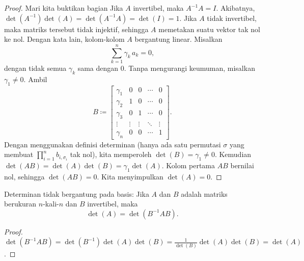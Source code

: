 \begin{proof}
Mari kita buktikan bagian
Jika $A$ invertibel,
maka $A^{-1}A = I$.
Akibatnya, $\det(A^{-1})\det(A) = \det(A^{-1}A) = \det(I) = 1$.
Jika $A$ tidak invertibel, maka matriks tersebut tidak injektif, sehingga $A$ memetakan
suatu vektor tak nol ke nol.
Dengan kata lain, kolom-kolom $A$ bergantung linear.
Misalkan
\begin{equation*}
\sum_{k=1}^n \gamma_k\, a_k = 0 ,
\end{equation*}
dengan tidak semua $\gamma_k$ sama dengan 0.
Tanpa mengurangi keumuman, misalkan $\gamma_1\neq 0$.
Ambil
\begin{equation*}
B \coloneqq
\begin{bmatrix}
\gamma_1 & 0 & 0 & \cdots & 0 \\
\gamma_2 & 1 & 0 & \cdots & 0 \\
\gamma_3 & 0 & 1 & \cdots & 0 \\
\vdots & \vdots & \vdots & \ddots & \vdots \\
\gamma_n & 0 & 0 & \cdots & 1
\end{bmatrix} .
\end{equation*}
Dengan menggunakan definisi determinan (hanya ada satu
permutasi $\sigma$ yang membuat $\prod_{i=1}^n b_{i,\sigma_i}$ tak nol),
kita memperoleh $\det(B) = \gamma_1 \neq 0$.
Kemudian
$\det(AB) = \det(A)\det(B) = \gamma_1\det(A)$.
Kolom pertama $AB$ bernilai nol, sehingga $\det(AB) = 0$.  Kita menyimpulkan
$\det(A) = 0$.
\end{proof}

\begin{prop}
Determinan tidak bergantung pada basis: Jika $A$ dan $B$ adalah
matriks berukuran $n$-kali-$n$ dan $B$
invertibel, maka
\begin{equation*}
\det(A) = \det(B^{-1}AB) .
\end{equation*}
\end{prop}

\begin{proof}
$\det(B^{-1}AB) =
\det(B^{-1})\det(A)\det(B) =
\frac{1}{\det(B)}\det(A)\det(B) = \det(A)$.
\end{proof}

